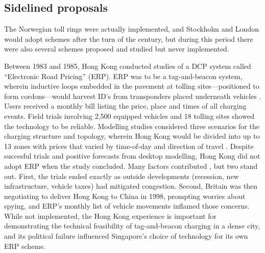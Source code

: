 \subsection{Sidelined proposals}

The Norwegian toll rings were actually implemented, and Stockholm and London would adopt schemes after the turn of the century, but during this period there were also several schemes proposed and studied but never implemented.

 Between 1983 and 1985, Hong Kong conducted studies of a DCP system called ``Electronic Road Pricing'' (ERP). ERP was to be a tag-and-beacon system, wherein inductive loops embedded in the pavement at tolling sites---positioned to form cordons---would harvest ID's from transponders placed underneath vehicles \citep{Dawson1986}. Users received a monthly bill listing the price, place and times of all charging events. Field trials involving 2,500 equipped vehicles and 18 tolling sites showed the technology to be reliable. Modelling studies considered three scenarios for the charging structure and topology, wherein Hong Kong would be divided into up to 13 zones with prices that varied by time-of-day and direction of travel \citep[Table 11, p. 23]{Gomez-Ibanez1994}.  Despite succesful trials and positive forecasts from desktop modelling, Hong Kong did not adopt ERP when the study concluded. Many factors contributed \citep{Hau1990,Borins1988}, but two stand out. First, the trials ended exactly as outside developments (recession, new infrastructure, vehicle taxes) had mitigated congestion. Second, Britain was then negotiating to deliver Hong Kong to China in 1998, prompting worries about spying, and  ERP's monthly list of vehicle movements inflamed those concerns. While not implemented, the Hong Kong experience is important for demonstrating the technical feasibility of tag-and-beacon charging in a dense city, and its political failure influenced Singapore's choice of technology for its own ERP scheme.

